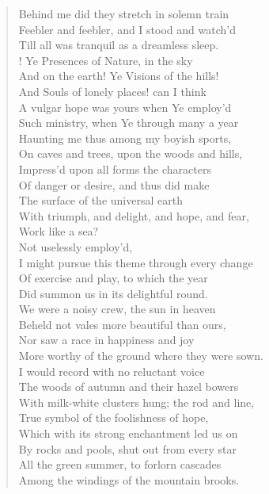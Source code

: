 \begin{verse}
Behind me did they stretch in solemn train	  \\
Feebler and feebler, and I stood and watch'd  \\
Till all was tranquil as a dreamless sleep.  \\!
Ye Presences of Nature, in the sky  \\
And on the earth! Ye Visions of the hills!  \\
And Souls of lonely places! can I think	  \\
A vulgar hope was yours when Ye employ'd  \\
Such ministry, when Ye through many a year  \\
Haunting me thus among my boyish sports,  \\
On caves and trees, upon the woods and hills,  \\
Impress'd upon all forms the characters	  \\
Of danger or desire, and thus did make  \\
The surface of the universal earth  \\
With triumph, and delight, and hope, and fear,  \\
Work like a sea?  \\
Not uselessly employ'd,	  \\
I might pursue this theme through every change  \\
Of exercise and play, to which the year  \\
Did summon us in its delightful round.  \\
We were a noisy crew, the sun in heaven  \\
Beheld not vales more beautiful than ours,	  \\
Nor saw a race in happiness and joy  \\
More worthy of the ground where they were sown.  \\
I would record with no reluctant voice  \\
The woods of autumn and their hazel bowers  \\
With milk-white clusters hung; the rod and line,	  \\
True symbol of the foolishness of hope,  \\
Which with its strong enchantment led us on  \\
By rocks and pools, shut out from every star  \\
All the green summer, to forlorn cascades  \\
Among the windings of the mountain brooks.	  \\

\end{verse}
